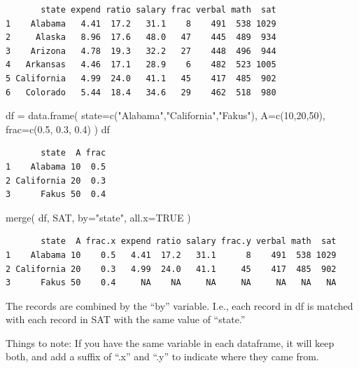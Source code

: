 \documentclass[
  letterpaper,
  DIV=11,
  numbers=noendperiod]{scrreprt}
\newenvironment{Shaded}{\begin{snugshade}}{\end{snugshade}}
\newcommand{\AttributeTok}[1]{\textcolor[rgb]{0.49,0.56,0.16}{#1}}
\newcommand{\ConstantTok}[1]{\textcolor[rgb]{0.53,0.00,0.00}{#1}}
\newcommand{\DecValTok}[1]{\textcolor[rgb]{0.25,0.63,0.44}{#1}}
\newcommand{\FloatTok}[1]{\textcolor[rgb]{0.25,0.63,0.44}{#1}}
\newcommand{\FunctionTok}[1]{\textcolor[rgb]{0.02,0.16,0.49}{#1}}
\newcommand{\NormalTok}[1]{\textcolor[rgb]{0.00,0.44,0.13}{#1}}
\newcommand{\OtherTok}[1]{\textcolor[rgb]{0.00,0.44,0.13}{#1}}
\newcommand{\StringTok}[1]{\textcolor[rgb]{0.25,0.44,0.63}{#1}}
\begin{document}
\begin{verbatim}
       state expend ratio salary frac verbal math  sat
1    Alabama   4.41  17.2   31.1    8    491  538 1029
2     Alaska   8.96  17.6   48.0   47    445  489  934
3    Arizona   4.78  19.3   32.2   27    448  496  944
4   Arkansas   4.46  17.1   28.9    6    482  523 1005
5 California   4.99  24.0   41.1   45    417  485  902
6   Colorado   5.44  18.4   34.6   29    462  518  980
\end{verbatim}

\begin{Shaded}
\begin{Highlighting}[]
\NormalTok{df }\OtherTok{=} \FunctionTok{data.frame}\NormalTok{( }\AttributeTok{state=}\FunctionTok{c}\NormalTok{(}\StringTok{"Alabama"}\NormalTok{,}\StringTok{"California"}\NormalTok{,}\StringTok{"Fakus"}\NormalTok{), }
                \AttributeTok{A=}\FunctionTok{c}\NormalTok{(}\DecValTok{10}\NormalTok{,}\DecValTok{20}\NormalTok{,}\DecValTok{50}\NormalTok{), }
                \AttributeTok{frac=}\FunctionTok{c}\NormalTok{(}\FloatTok{0.5}\NormalTok{, }\FloatTok{0.3}\NormalTok{, }\FloatTok{0.4}\NormalTok{) )}
\NormalTok{df}
\end{Highlighting}
\end{Shaded}

\begin{verbatim}
       state  A frac
1    Alabama 10  0.5
2 California 20  0.3
3      Fakus 50  0.4
\end{verbatim}

\begin{Shaded}
\begin{Highlighting}[]
\FunctionTok{merge}\NormalTok{( df, SAT, }\AttributeTok{by=}\StringTok{"state"}\NormalTok{, }\AttributeTok{all.x=}\ConstantTok{TRUE}\NormalTok{ )}
\end{Highlighting}
\end{Shaded}

\begin{verbatim}
       state  A frac.x expend ratio salary frac.y verbal math  sat
1    Alabama 10    0.5   4.41  17.2   31.1      8    491  538 1029
2 California 20    0.3   4.99  24.0   41.1     45    417  485  902
3      Fakus 50    0.4     NA    NA     NA     NA     NA   NA   NA
\end{verbatim}

The records are combined by the ``by'' variable. I.e., each record in df
is matched with each record in SAT with the same value of ``state.''

Things to note: If you have the same variable in each dataframe, it will
keep both, and add a suffix of ``.x'' and ``.y'' to indicate where they
came from.
\end{document}
